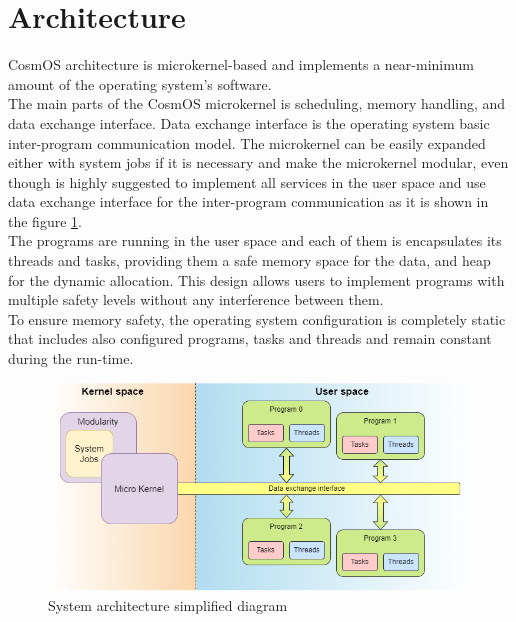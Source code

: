 \section{Architecture}
\indent CosmOS architecture is microkernel-based and implements a near-minimum amount of the operating system’s software.\\ 
\indent The main parts of the CosmOS microkernel is scheduling, memory handling, and data exchange interface. Data exchange interface is the operating system basic inter-program communication model. The microkernel can be easily expanded either with system jobs if it is necessary and make the microkernel modular, even though is highly suggested to implement all services in the user space and use data exchange interface for the inter-program communication as it is shown in the figure \ref{fig:systemArchitecture}.\\
\indent The programs are running in the user space and each of them is encapsulates its threads and tasks, providing them a safe memory space for the data, and heap for the dynamic allocation. This design allows users to implement programs with multiple safety levels without any interference between them. \\
\indent To ensure memory safety, the operating system configuration is completely static that includes also configured programs, tasks and threads and remain constant during the run-time. 
\begin{figure}[H]
\begin{center}
\includegraphics[width=1\textwidth]{images/system_architecture.png}
\caption{System architecture simplified diagram}
\label{fig:systemArchitecture}
\end{center}
\end{figure}

